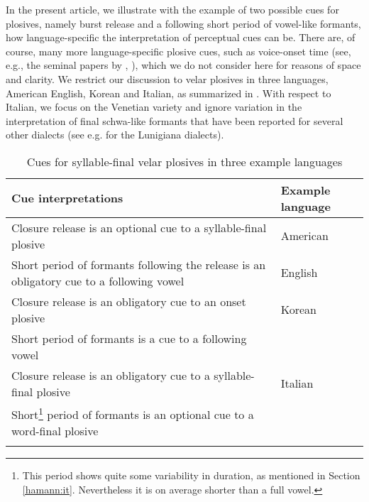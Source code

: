 \documentclass[output=paper,colorlinks,citecolor=brown]{langscibook}
\begin{document}
In the present article, we illustrate with the example of two possible cues for plosives, namely burst release and a following short period of vowel-like formants, how language-specific the interpretation of perceptual cues can be. There are, of course, many more language-specific plosive cues, such as voice-onset time (see, e.g., the seminal papers by \cite{LiskerAbramson1964}, \citeyear{LiskerAbramson1970}), which we do not consider here for reasons of space and clarity.
We restrict our discussion to velar plosives in three languages, American English, Korean and Italian, as summarized in . With respect to Italian, we focus on the Venetian variety and ignore variation in the interpretation of final schwa-like formants that have been reported for several other dialects (see e.g. \cite{Cavirani2015} for the Lunigiana dialects).

\begin{table}
\begin{tabularx}{\textwidth}{Q>{\raggedright\arraybackslash}p{}}
\lsptoprule
Cue interpretations & Example language\\ \midrule
 Closure release is an optional cue to a syllable-final plosive          & American  \\
 Short period of formants following the release is an obligatory cue to a following vowel & English  \\
      \tablevspace
 Closure release is an obligatory cue to an  onset plosive                & Korean \\
 Short period of formants is a cue to a following vowel                    & \\
      \tablevspace
 Closure release is an obligatory cue to a syllable-final plosive          & Italian \\
 Short\footnote{This period shows quite some variability in duration, as mentioned in Section \ref{hamann:it}. Nevertheless it is on average shorter than a full vowel.} period of formants is an optional cue to a word-final plosive & \\
\lspbottomrule
\end{tabularx}
\caption{Cues for syllable-final velar plosives in three example languages}
\label{hamann:cues}
\end{table}
\end{document}
